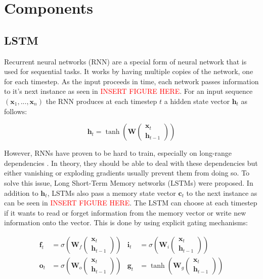 \section{Components}

\subsection{LSTM}

Recurrent neural networks (RNN)\cite{rnn} are a special form of neural network that is used for sequential tasks. It works by having multiple copies of the network, one for each timestep. As the input proceeds in time, each network passes information to it's next instance as seen in  \textcolor{red}{INSERT FIGURE HERE}. For an input sequence \((\mathbf{x}_1, ..., \mathbf{x}_n)\) the RNN produces at each timestep \(t\) a hidden state vector \(\mathbf{h}_t\) as follows:

\begin{equation*}
  \mathbf{h}_t = \tanh \left(\mathbf{W} \begin{pmatrix} \mathbf{x}_t \\ \mathbf{h}_{t-1} \end{pmatrix} \right)
\end{equation*}

However, RNNs have proven to be hard to train, especially on long-range dependencies \cite{hochreiter_rnn}. In theory, they should be able to deal with these dependencies but either vanishing or exploding gradients usually prevent them from doing so. To solve this issue, Long Short-Term Memory networks (LSTMs) \cite{lstm} were proposed. In addition to \(\mathbf{h}_t\), LSTMs also pass a memory state vector \(\mathbf{c}_t\) to the next instance as can be seen in \textcolor{red}{INSERT FIGURE HERE}. The LSTM can choose at each timestep if it wants to read or forget information from the memory vector or write new information onto the vector. This is done by using explicit gating mechanisms:

\begin{align*}
  \mathbf{f}_t &= \sigma \left(\mathbf{W}_f \begin{pmatrix} \mathbf{x}_t \\ \mathbf{h}_{t-1} \end{pmatrix} \right) &
  \mathbf{i}_t &= \sigma \left(\mathbf{W}_i \begin{pmatrix} \mathbf{x}_t \\ \mathbf{h}_{t-1} \end{pmatrix} \right) \\
  \mathbf{o}_t &= \sigma \left(\mathbf{W}_o \begin{pmatrix} \mathbf{x}_t \\ \mathbf{h}_{t-1} \end{pmatrix} \right) &
  \mathbf{g}_t &= \tanh \left(\mathbf{W}_g \begin{pmatrix} \mathbf{x}_t \\ \mathbf{h}_{t-1} \end{pmatrix} \right)
\end{align*}

